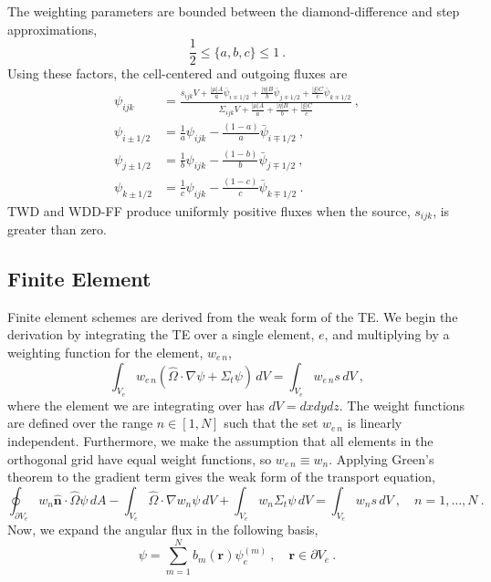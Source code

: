 \documentclass[12pt]{article}
\newcommand{\ve}[1]{\ensuremath{\mathbf{#1}}}
\newcommand{\vOmega}{\ensuremath{\hat{\Omega}}}
\begin{document}
The weighting parameters are bounded between the diamond-difference and step
approximations,
\begin{equation}
  \frac{1}{2}\le\{a,b,c\}\le 1\:.
\end{equation}
Using these factors, the cell-centered and outgoing fluxes are
\begin{equation}
  \begin{aligned}
    \psi_{ijk} &= \frac{s_{ijk}V + \frac{|\mu|A}{a}\bar{\psi}_{i\mp1/2} +
      \frac{|\eta|B}{b}\bar{\psi}_{j\mp1/2} +
      \frac{|\xi|C}{c}\bar{\psi}_{k\mp1/2}}{\Sigma_{ijk}V + \frac{|\mu|A}{a} +
      \frac{|\eta|B}{b} + \frac{|\xi|C}{c}}\:,\\
    \psi_{i\pm1/2} &= \frac{1}{a}\psi_{ijk}-
    \frac{(1-a)}{a}\bar{\psi}_{i\mp1/2}\:,\\
    \psi_{j\pm1/2} &= \frac{1}{b}\psi_{ijk}-
    \frac{(1-b)}{b}\bar{\psi}_{j\mp1/2}\:,\\
    \psi_{k\pm1/2} &= \frac{1}{c}\psi_{ijk}-
    \frac{(1-c)}{c}\bar{\psi}_{k\mp1/2}\:.
  \end{aligned}
  \label{eq:twd}
\end{equation}
TWD and WDD-FF produce uniformly positive fluxes when the source, $s_{ijk}$,
is greater than zero.


\subsection*{Finite Element}
Finite element schemes are derived from the weak form of
the TE. We begin the derivation by
integrating the TE over a single element, $e$, and
multiplying by a weighting function for the element, $w_{e\,n}$,
\begin{equation}
  \int_{V_e} w_{e\,n}(\vOmega\cdot\nabla\psi+\Sigma_t\psi)\,dV =
  \int_{V_e} w_{e\,n}s\,dV\:,
\end{equation}
where the element we are integrating over has $dV=dxdydz$.  The
weight functions are defined over the range $n\in[1,N]$ such that the set
$w_{e\,n}$ is linearly independent.  Furthermore, we make the assumption that
all elements in the orthogonal grid have equal weight functions, so
$w_{e\,n}\equiv w_n$.  Applying Green's theorem to the gradient term gives the
weak form of the transport equation,
\begin{equation}
  \oint_{\partial V_e}w_n\hat{\ve{n}}\cdot\vOmega\psi\,dA -
  \int_{V_e}\vOmega\cdot\nabla w_n\psi\,dV + \int_{V_e} w_n\Sigma_t\psi\,dV =
  \int_{V_e}w_ns\,dV\:, \quad n=1,\ldots,N\:.
  \label{eq:weak-form}
\end{equation}
Now, we expand the angular flux in the following basis,
\begin{equation}
  \psi = \sum_{m=1}^{N}b_m(\ve{r})\psi_e^{(m)}\:,\quad
  \ve{r}\in\partial V_e\:.
  \label{eq:psi_fe_expansion}
\end{equation}
\end{document}
